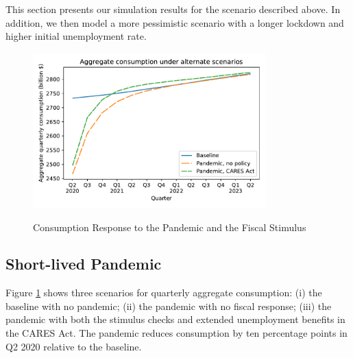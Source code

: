 \documentclass[titlepage,a4paper]{\econtex}
\begin{document}
This section presents our simulation results for the scenario described above. In addition, we then model a more pessimistic scenario with a longer lockdown and higher initial unemployment rate.
\hypertarget{cons-response}{}

\begin{figure}
  \centering
  \caption{Consumption Response to the Pandemic and the Fiscal Stimulus}
  \label{cons_response}
  { \includegraphics[width=0.8\textwidth]{./Figures/AggConResp_examples}}
\end{figure}

\subsection{Short-lived Pandemic}

Figure \ref{cons_response} shows three scenarios for quarterly aggregate consumption: (i) the baseline with no pandemic; (ii) the pandemic with no fiscal response; (iii) the pandemic with both the stimulus checks and extended unemployment benefits in the CARES Act.
The pandemic reduces consumption by ten percentage points in Q2 2020 relative to the baseline.
\end{document}

